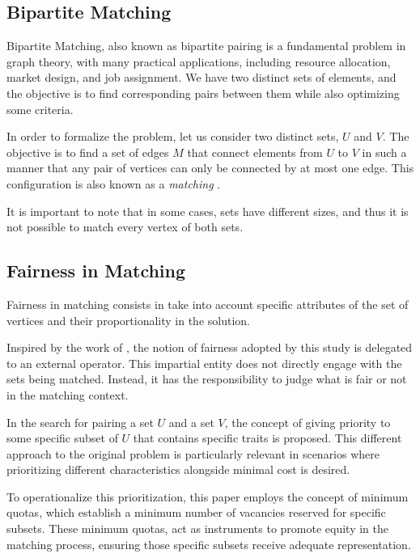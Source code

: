         \subsection{Bipartite Matching}

            Bipartite Matching, also known as bipartite pairing is a fundamental problem in graph theory, with many practical applications, including resource allocation, market design, and job assignment.
            We have two distinct sets of elements, and the objective is to find corresponding pairs between them while also optimizing some criteria.
            
            In order to formalize the problem, let us consider two distinct sets, \(U\) and \(V\). The objective is to find a set of edges \(M\) that connect elements from \(U\) to \(V\) in such a manner that any pair of vertices can only be connected by at most one edge. This configuration is also known as a \textit{matching} \cite{hopcroft1973n}.
            
            It is important to note that in some cases, sets have different sizes, and thus it is not possible to match every vertex of both sets.
            
            \subsection{Fairness in Matching}
            
            Fairness in matching consists in take into account specific attributes of the set of vertices and their proportionality in the solution.
            
            Inspired by the work of \cite{sankar}, the notion of fairness adopted by this study is delegated to an external operator. This impartial entity does not directly engage with the sets being matched. Instead, it has the responsibility to judge what is fair or not in the matching context.
            
            In the search for pairing a set $U$ and a set $V$, the concept of giving priority to some specific subset of $U$ that contains specific traits is proposed. This different approach to the original problem is particularly relevant in scenarios where prioritizing different characteristics alongside minimal cost is desired.
            
            To operationalize this prioritization, this paper employs the concept of minimum quotas, which establish a minimum number of vacancies reserved for specific subsets. 
            These minimum quotas, act as instruments to promote equity in the matching process, ensuring those specific subsets receive adequate representation.
            
